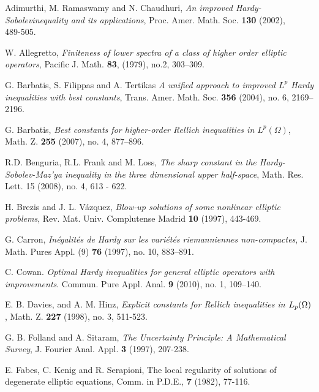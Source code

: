 \documentclass[12pt]{amsart}
\numberwithin{equation}{section}
\numberwithin{theorem}{section}
\numberwithin{theorem}{section} \numberwithin{lemma}{section}
\numberwithin{definition}{section}
\numberwithin{corollary}{section}
\numberwithin{remark}{section}
\numberwithin{proposition}{section}
\begin{document}

\begin{thebibliography}{A}

 Adimurthi, M. Ramaswamy and N. Chaudhuri, \textit{An improved Hardy-Sobolevinequality and its applications}, Proc. Amer. Math. Soc. {\bf 130 } (2002), 489-505.

 W. Allegretto, \textit{Finiteness of lower spectra of a class of higher order elliptic operators},  Pacific J. Math. {\bf 83}, (1979), no.2, 303--309.

 G. Barbatis,   S. Filippas and  A. Tertikas \textit{ A unified approach to  improved $L^p$ Hardy inequalities  with
best constants}, Trans. Amer. Math. Soc. {\bf 356} (2004), no. 6,
2169--2196.

 G. Barbatis, \textit { Best constants for higher-order Rellich inequalities in
$L^p(\Omega)$}, Math. Z. {\bf 255} (2007), no. 4, 877--896.

 R.D.  Benguria, R.L.  Frank and M. Loss, \textit{The sharp constant in the Hardy-Sobolev-Maz'ya inequality in the
three dimensional upper half-space}, Math. Res. Lett. 15 (2008), no.
4, 613 - 622.

 H. Brezis and J. L. V\'azquez, \textit{Blow-up solutions of some nonlinear elliptic
problems}, Rev. Mat. Univ. Complutense Madrid \textbf{10} (1997),
443-469.

 G. Carron, \textit{In\'egalit\'es de Hardy sur les vari\'et\'es riemanniennes
non-compactes}, J. Math. Pures Appl. (9) {\bf 76} (1997), no. 10,
883--891.

 C. Cowan. \textit{Optimal Hardy inequalities for general elliptic operators with improvements}.  Commun. Pure Appl. Anal.  {\bf 9}  (2010),  no. 1, 109--140.

 E. B. Davies, and A. M. Hinz, \textit{Explicit constants for Rellich inequalities in $L\sb p(\Omega)$},
 Math. Z. \textbf {227} (1998), no. 3, 511-523.

 G. B. Folland and A. Sitaram, \textit{The Uncertainty Principle: A Mathematical Survey},
J. Fourier Anal. Appl. \textbf{3} (1997), 207-238.

 E. Fabes, C. Kenig and R. Serapioni, The local regularity of
solutions of degenerate elliptic equations, Comm. in P.D.E.,
\textbf{7} (1982), 77-116.


\end{thebibliography}
\end{document}
